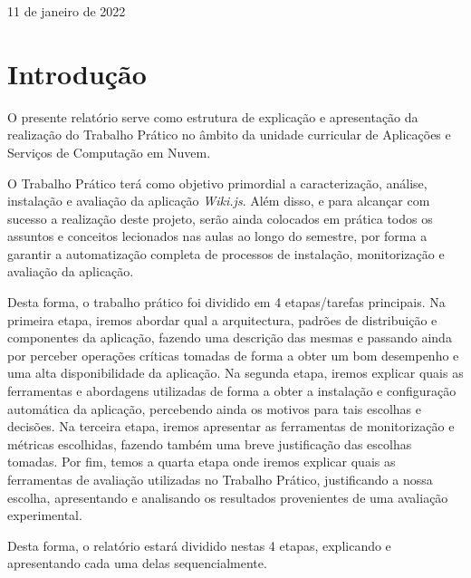 \documentclass[11pt]{article}
\begin{document}
\begin{titlepage}
\begin{center}
        \vspace{4cm}
        
        11 de janeiro de 2022
            
    \end{center}
\end{titlepage}

\tableofcontents
\thispagestyle{empty}

\setcounter{page}{1}


\clearpage
\section{Introdução}

O presente relatório serve como estrutura de explicação e apresentação da realização do Trabalho Prático no âmbito da unidade curricular de Aplicações e Serviços de Computação em Nuvem. 

O Trabalho Prático terá como objetivo primordial a caracterização, análise, instalação e avaliação da aplicação \textit{Wiki.js}. Além disso, e para alcançar com sucesso a realização deste projeto, serão ainda colocados em prática todos os assuntos e conceitos lecionados nas aulas ao longo do semestre, por forma a garantir a automatização completa de processos de instalação, monitorização e avaliação da aplicação.

Desta forma, o trabalho prático foi dividido em 4 etapas/tarefas principais. Na primeira etapa, iremos abordar qual a arquitectura, padrões de distribuição e componentes da aplicação, fazendo uma descrição das mesmas e passando ainda por perceber operações críticas tomadas de forma a obter um bom desempenho e uma alta disponibilidade da aplicação. Na segunda etapa, iremos explicar quais as ferramentas e abordagens utilizadas de forma a obter a instalação e configuração automática da aplicação, percebendo ainda os motivos para tais escolhas e decisões. Na terceira etapa, iremos apresentar as ferramentas de monitorização e métricas escolhidas, fazendo também uma breve justificação das escolhas tomadas. Por fim, temos a quarta etapa onde iremos explicar quais as ferramentas de avaliação utilizadas no Trabalho Prático, justificando a nossa escolha, apresentando e analisando os resultados provenientes de uma avaliação experimental.

Desta forma, o relatório estará dividido nestas 4 etapas, explicando e apresentando cada uma delas sequencialmente.
\end{document}
